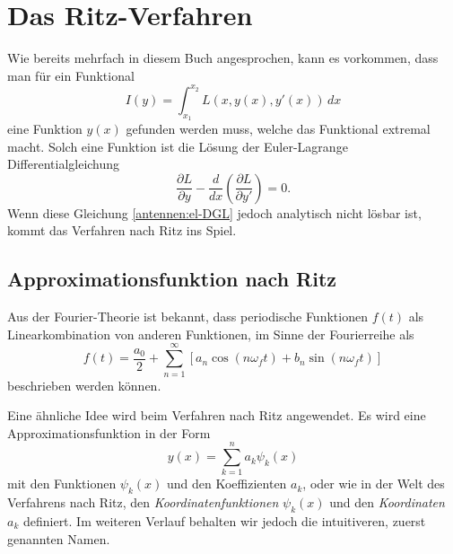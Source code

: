 %
%
% 
%
%

\section{Das Ritz-Verfahren\label{antennen:ritzGrundsätzlich}}

Wie bereits mehrfach in diesem Buch angesprochen, kann es vorkommen, dass man für ein Funktional
\begin{equation}
I(y)
=
\int_{x_1}^{x_2}L(x,y(x),y'(x))\,dx
\label{antennen:normalesFunktional}
\end{equation}
eine Funktion $y(x)$ gefunden werden muss, welche das Funktional extremal macht.
Solch eine Funktion ist die Lösung der Euler-Lagrange Differentialgleichung
\begin{equation}
\frac{\partial L}{\partial y} - \frac{d}{dx} \left( \frac{\partial L}{\partial y'} \right) = 0.
\label{antennen:el-DGL}
\end{equation}
Wenn diese Gleichung \eqref{antennen:el-DGL} 
jedoch analytisch nicht lösbar ist, kommt das Verfahren nach Ritz ins Spiel.
%
%

\subsection{Approximationsfunktion nach Ritz\label{antennen:approxFunkt}}

Aus der Fourier-Theorie ist bekannt, dass
periodische Funktionen $f(t)$ als Linearkombination von anderen Funktionen, 
im Sinne der Fourierreihe als
\begin{equation}
f(t)
=
\frac{a_0}{2}+\sum_{n=1}^{\infty}[a_n\cos{(n \omega_f t)}+b_n\sin{(n \omega_f t)}]
\label{antennen:fourier}
\end{equation}
beschrieben werden können.

Eine ähnliche Idee wird beim Verfahren nach Ritz angewendet.
Es wird eine Approximationsfunktion in der Form
\begin{equation}
y(x)=\sum_{k=1}^n a_k \psi_k(x)
\label{antennen:ritzFunkt}
\end{equation}
mit den Funktionen $\psi_k(x)$ und den Koeffizienten $a_k$, oder
wie in der Welt des Verfahrens nach Ritz, den 
{\em Koordinatenfunktionen} $\psi_k(x)$ und den {\em Koordinaten}
$a_k$ definiert. 
%
%
Im weiteren Verlauf behalten wir jedoch die intuitiveren, zuerst genannten Namen.

